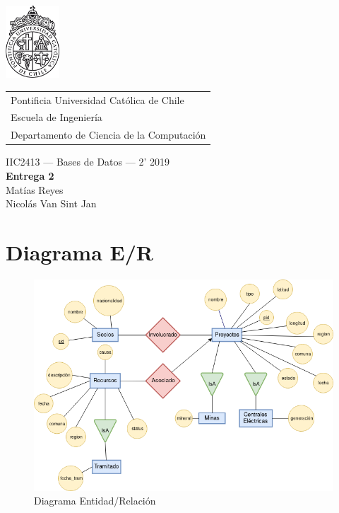 \documentclass{article}
\begin{document}
\includegraphics[width=2cm]{uc.png}
\vspace*{-1.9cm}

\hspace*{2.1cm}
 \begin{tabular}{l}
  \sc Pontificia Universidad Católica de Chile \\
  \sc Escuela de Ingeniería \\
  \sc Departamento de Ciencia de la Computación
 \end{tabular}
 \bigskip

\vspace*{5mm}
\begin{center}
{IIC2413 --- Bases de Datos --- 2' 2019} \\
\vspace{3mm}
{\Large\bf Entrega 2} \\
\vspace{2mm}
Matías Reyes \\
Nicolás Van Sint Jan
\end{center}

\section{Diagrama E/R}

\begin{figure}[h]	
	\includegraphics[scale=0.60]{ER_v1.png}
	\caption{Diagrama Entidad/Relación}
\end{figure}
\end{document}
